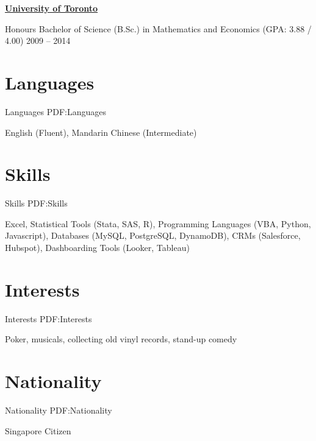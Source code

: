 \documentclass[letterpaper,10pt,oneside]{article}
\begin{document}
\begin{body}
\href{https://www.utoronto.ca/}
{\textbf{University of Toronto}}

\GapNoBreak
\BulletItem
Honours Bachelor of Science (B.Sc.) in Mathematics and Economics (GPA: 3.88 / 4.00)
\hfill
2009 -- 2014


\section
{Languages}
{Languages}
{PDF:Languages}

English (Fluent), Mandarin Chinese (Intermediate)


\section
{Skills}
{Skills}
{PDF:Skills}

Excel, Statistical Tools (Stata, SAS, R), Programming Languages (VBA, Python, Javascript), Databases (MySQL, PostgreSQL, DynamoDB), CRMs (Salesforce, Hubspot), Dashboarding Tools (Looker, Tableau)


\section
{Interests}
{Interests}
{PDF:Interests}

Poker, musicals, collecting old vinyl records, stand-up comedy

\section
{Nationality}
{Nationality}
{PDF:Nationality}

Singapore Citizen 

\end{body}
\end{document}

